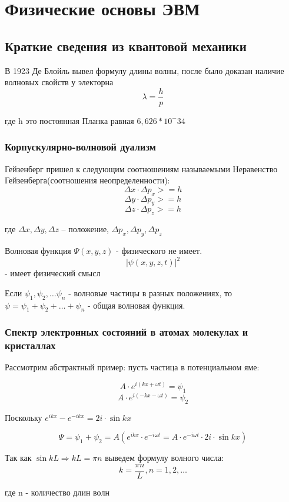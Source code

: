 \documentclass[../main.tex]{subfiles}
\begin{document}
\chapter{Физические основы ЭВМ}

\section{Краткие сведения из квантовой механики}
В 1923 Де Блойль вывел формулу длины волны, после было доказан наличие волновых свойств у электорна
\[\lambda = \frac{h}{p}\]
\begin{center}
    где h это постоянная Планка равная $6,626 * 10 ^-34$
\end{center}
\subsection{Корпускулярно-волновой дуализм}
Гейзенберг пришел к следующим соотношениям называемыми Неравенство Гейзенберга(соотношения неопределенности):
\[\Delta x \cdot \Delta p_x >= h\]
\[\Delta y \cdot \Delta p_y >= h\]
\[\Delta z \cdot \Delta p_z >= h\]
\begin{center}
    где $\Delta x, \Delta y, \Delta z$ -- положение, $\Delta p_x, \Delta p_y, \Delta p_z$
\end{center}

Волновая функция $\Psi(x,y,z)$ - физического не имеет.
\[ |\psi(x,y,z,t)| ^2 \] - имеет физический смысл

Если $\psi_1, \psi_2, \ldots \psi_n$ - волновые частицы в разных положениях, то
$\psi = \psi_1 + \psi_2 + \ldots + \psi_n$ -  общая волновая функция.

\subsection{Спектр электронных состояний в атомах молекулах и кристаллах}
Рассмотрим абстрактный пример: пусть частица в потенциальном яме:

\[A \cdot e^{i(kx+ \omega t)} = \psi_1\]
\[A \cdot e^{i(-kx - \omega t)} = \psi_2\]

Поскольку $e^{ikx} - e^{-ikx} = 2i \cdot \sin{kx}$

\[\Psi = \psi_1 + \psi_2 = A(e^{ikx} \cdot e^{-i \omega t} = A \cdot e^{-i \omega t} \cdot 2i \cdot \sin{kx})\]

Так как $\sin{kL} \Rightarrow kL = \pi n$ выведем формулу волного числа:
\[k = \frac{\pi n}{L} , n = 1, 2, \ldots\]
\begin{center}
    где n - количество длин волн
\end{center}
\end{document}
